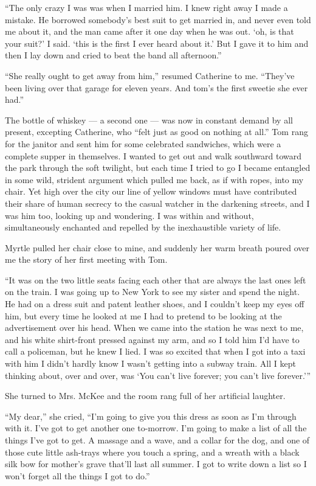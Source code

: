 \documentclass{znotebook}
\begin{document}
``The only crazy I was was when I married him. I knew right away I made a mistake. He borrowed somebody’s best suit to get married in, and never even told me about it, and the man came after it one day when he was out. ‘oh, is that your suit?’ I said. ‘this is the first I ever heard about it.’ But I gave it to him and then I lay down and cried to beat the band all afternoon.''

``She really ought to get away from him,'' resumed Catherine to me. ``They’ve been living over that garage for eleven years. And tom’s the first sweetie she ever had.''

The bottle of whiskey — a second one — was now in constant demand by all present, excepting Catherine, who ``felt just as good on nothing at all.'' Tom rang for the janitor and sent him for some celebrated sandwiches, which were a complete supper in themselves. I wanted to get out and walk southward toward the park through the soft twilight, but each time I tried to go I became entangled in some wild, strident argument which pulled me back, as if with ropes, into my chair. Yet high over the city our line of yellow windows must have contributed their share of human secrecy to the casual watcher in the darkening streets, and I was him too, looking up and wondering. I was within and without, simultaneously enchanted and repelled by the inexhaustible variety of life.

Myrtle pulled her chair close to mine, and suddenly her warm breath poured over me the story of her first meeting with Tom.

``It was on the two little seats facing each other that are always the last ones left on the train. I was going up to New York to see my sister and spend the night. He had on a dress suit and patent leather shoes, and I couldn’t keep my eyes off him, but every time he looked at me I had to pretend to be looking at the advertisement over his head. When we came into the station he was next to me, and his white shirt-front pressed against my arm, and so I told him I’d have to call a policeman, but he knew I lied. I was so excited that when I got into a taxi with him I didn’t hardly know I wasn’t getting into a subway train. All I kept thinking about, over and over, was ‘You can’t live forever; you can’t live forever.’''

She turned to Mrs. McKee and the room rang full of her artificial laughter.

``My dear,'' she cried, ``I’m going to give you this dress as soon as I’m through with it. I’ve got to get another one to-morrow. I’m going to make a list of all the things I’ve got to get. A massage and a wave, and a collar for the dog, and one of those cute little ash-trays where you touch a spring, and a wreath with a black silk bow for mother’s grave that’ll last all summer. I got to write down a list so I won’t forget all the things I got to do.''
\end{document}
